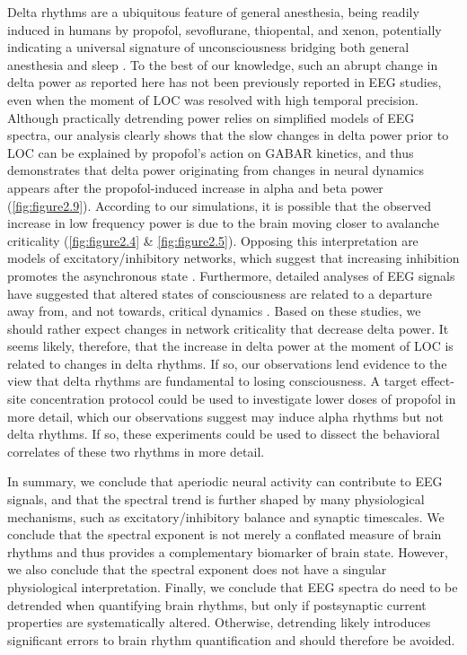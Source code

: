 Delta rhythms are a ubiquitous feature of general anesthesia, being readily induced in humans by propofol, sevoflurane, thiopental, and xenon\cite{Purdon2013, Gugino2001, Huupponen2008, Johnson2003, Lewis2012, Ma2006, Murphy2011}, potentially indicating a universal signature of unconsciousness bridging both general anesthesia and sleep \cite{Amzica1998, LeMasson2002, Steriade2000}. To the best of our knowledge, such an abrupt change in delta power as reported here has not been previously reported in EEG studies, even when the moment of LOC was resolved with high temporal precision\cite{Purdon2013}. Although practically detrending power relies on simplified models of EEG spectra, our analysis clearly shows that the slow changes in delta power prior to LOC can be explained by propofol’s action on GABAR kinetics, and thus demonstrates that delta power originating from changes in neural dynamics appears after the propofol-induced increase in alpha and beta power (\autoref{fig:figure2.9}). According to our simulations, it is possible that the observed increase in low frequency power is due to the brain moving closer to avalanche criticality (\autoref{fig:figure2.4} \& \ref{fig:figure2.5}). Opposing this interpretation are models of excitatory/inhibitory networks, which suggest that increasing inhibition promotes the asynchronous state \cite{Li2020}. Furthermore, detailed analyses of EEG signals have suggested that altered states of consciousness are related to a departure away from, and not towards, critical dynamics \cite{Tagliazucchi2016, Toker2022}. Based on these studies, we should rather expect changes in network criticality that decrease delta power. It seems likely, therefore, that the increase in delta power at the moment of LOC is related to changes in delta rhythms. If so, our observations lend evidence to the view that delta rhythms are fundamental to losing consciousness. A target effect-site concentration protocol could be used to investigate lower doses of propofol in more detail, which our observations suggest may induce alpha rhythms but not delta rhythms. If so, these experiments could be used to dissect the behavioral correlates of these two rhythms in more detail.

In summary, we conclude that aperiodic neural activity can contribute to EEG signals, and that the spectral trend is further shaped by many physiological mechanisms, such as excitatory/inhibitory balance and synaptic timescales. We conclude that the spectral exponent is not merely a conflated measure of brain rhythms and thus provides a complementary biomarker of brain state. However, we also conclude that the spectral exponent does not have a singular physiological interpretation. Finally, we conclude that EEG spectra do need to be detrended when quantifying brain rhythms, but only if postsynaptic current properties are systematically altered. Otherwise, detrending likely introduces significant errors to brain rhythm quantification and should therefore be avoided.

